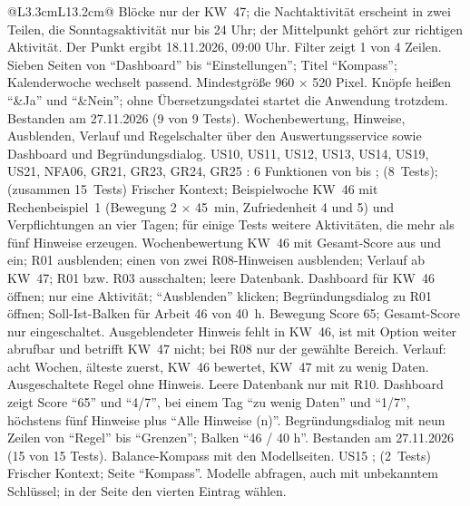 \begin{longtable}{@{}L{3.3cm}L{13.2cm}@{}}
    {Blöcke nur der KW~47; die Nachtaktivität erscheint in zwei Teilen, die Sonntagsaktivität nur bis 24 Uhr; der Mittelpunkt gehört zur richtigen Aktivität. Der Punkt ergibt 18.11.2026, 09:00 Uhr. Filter zeigt 1 von 4 Zeilen. Sieben Seiten von \enquote{Dashboard} bis \enquote{Einstellungen}; Titel \enquote{Kompass}; Kalenderwoche wechselt passend. Mindestgröße 960 $\times$ 520 Pixel. Knöpfe heißen \enquote{\&Ja} und \enquote{\&Nein}; ohne Übersetzungsdatei startet die Anwendung trotzdem.}
    {Bestanden am 27.11.2026 (9 von 9 Tests).}
  \midrule
    {Wochenbewertung, Hinweise, Ausblenden, Verlauf und Regelschalter über den Auswertungsservice sowie Dashboard und Begründungsdialog.}
    {US10, US11, US12, US13, US14, US19, US21, NFA06, GR21, GR23, GR24, GR25}
    {: 6 Funktionen von  bis ;  (8~Tests);  (zusammen 15~Tests)}
    {Frischer Kontext; Beispielwoche KW~46 mit Rechenbeispiel~1 (Bewegung 2 $\times$ 45~min, Zufriedenheit 4 und 5) und Verpflichtungen an vier Tagen; für einige Tests weitere Aktivitäten, die mehr als fünf Hinweise erzeugen.}
    {Wochenbewertung KW~46 mit Gesamt-Score aus und ein; R01 ausblenden; einen von zwei R08-Hinweisen ausblenden; Verlauf ab KW~47; R01 bzw. R03 ausschalten; leere Datenbank. Dashboard für KW~46 öffnen; nur eine Aktivität; \enquote{Ausblenden} klicken; Begründungsdialog zu R01 öffnen; Soll-Ist-Balken für Arbeit 46 von 40~h.}
    {Bewegung Score 65; Gesamt-Score nur eingeschaltet. Ausgeblendeter Hinweis fehlt in KW~46, ist mit Option weiter abrufbar und betrifft KW~47 nicht; bei R08 nur der gewählte Bereich. Verlauf: acht Wochen, älteste zuerst, KW~46 bewertet, KW~47 mit zu wenig Daten. Ausgeschaltete Regel ohne Hinweis. Leere Datenbank nur mit R10. Dashboard zeigt Score \enquote{65} und \enquote{4/7}, bei einem Tag \enquote{zu wenig Daten} und \enquote{1/7}, höchstens fünf Hinweise plus \enquote{Alle Hinweise (n)}. Begründungsdialog mit neun Zeilen von \enquote{Regel} bis \enquote{Grenzen}; Balken \enquote{46 / 40 h}.}
    {Bestanden am 27.11.2026 (15 von 15 Tests).}
  \midrule
    {Balance-Kompass mit den Modellseiten.}
    {US15}
    {;  (2~Tests)}
    {Frischer Kontext; Seite \enquote{Kompass}.}
    {Modelle abfragen, auch mit unbekanntem Schlüssel; in der Seite den vierten Eintrag wählen.}

\end{longtable}
